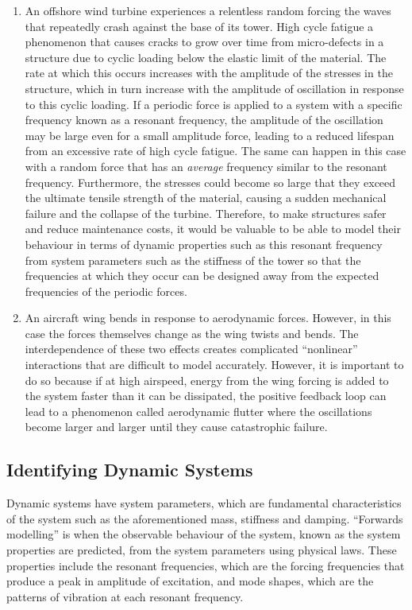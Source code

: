 \documentclass[12pt]{article}
\begin{document}
\begin{enumerate}
        \item An offshore wind turbine experiences a relentless random forcing the waves that repeatedly crash against the base of its tower.
        High cycle fatigue a phenomenon that causes cracks to grow over time from micro-defects in a structure due to cyclic loading below the elastic limit of the material.
        The rate at which this occurs increases with the amplitude of the stresses in the structure, which in turn increase with the amplitude of oscillation in response to this cyclic loading.
        If a periodic force is applied to a system with a specific frequency known as a resonant frequency, the amplitude of the oscillation may be large even for a small amplitude force, leading to a reduced lifespan from an excessive rate of high cycle fatigue.
        The same can happen in this case with a random force that has an \textit{average} frequency similar to the resonant frequency.
        Furthermore, the stresses could become so large that they exceed the ultimate tensile strength of the material, causing a sudden mechanical failure and the collapse of the turbine.
        Therefore, to make structures safer and reduce maintenance costs, it would be valuable to be able to model their behaviour in terms of dynamic properties such as this resonant frequency from system parameters such as the stiffness of the tower so that the frequencies at which they occur can be designed away from the expected frequencies of the periodic forces.

        \item An aircraft wing bends in response to aerodynamic forces.
        However, in this case the forces themselves change as the wing twists and bends.
        The interdependence of these two effects creates complicated ``nonlinear'' interactions that are difficult to model accurately.
        However, it is important to do so because if at high airspeed, energy from the wing forcing is added to the system faster than it can be dissipated, the positive feedback loop can lead to a phenomenon called aerodynamic flutter where the oscillations become larger and larger until they cause catastrophic failure.
    \end{enumerate}

    \subsection{Identifying Dynamic Systems}

    Dynamic systems have system parameters, which are fundamental characteristics of the system such as the aforementioned mass, stiffness and damping.
    ``Forwards modelling'' is when the observable behaviour of the system, known as the system properties are predicted, from the system parameters using physical laws.
    These properties include the resonant frequencies, which are the forcing frequencies that produce a peak in amplitude of excitation, and mode shapes, which are the patterns of vibration at each resonant frequency.
\end{document}
